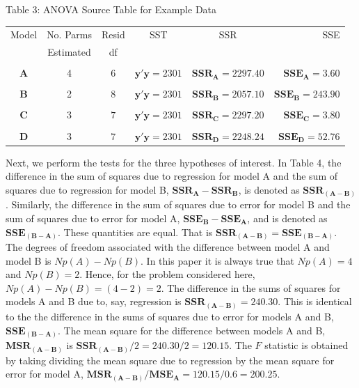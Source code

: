 \documentclass[11pt, oneside]{article}   	%
\begin{document}
\begin{table} [h]
\centerline{Table 3: ANOVA Source Table for Example Data} 
\centering
\bigskip
\begin{tabular}{cccccr}
Model & No. Parms & Resid & SST & SSR & SSE \\ 
          & Estimated &   df   &   &    & \\
\hline
    &    &     &    &    &  \\
\textbf{A}  &  4  &  $ 6 $  &  $  \mathbf{y} ' \mathbf{y} = 2301 $  & $ \mathbf{SSR_{A}} = 2297.40 $ &   $ \mathbf{SSE_{A}} =  3.60    $        \\
 &  &  &  &  &  \\
\textbf{B}  &  2  &  $ 8 $  &  $  \mathbf{y} ' \mathbf{y} = 2301 $  & $ \mathbf{SSR_{B}} = 2057.10 $ &   $  \mathbf{SSE_{B}} =  243.90   $        \\
&  &  &  &  &  \\
\textbf{C}  &  3  &  $ 7 $  &  $  \mathbf{y} ' \mathbf{y} = 2301 $  & $ \mathbf{SSR_{C}} = 2297.20 $ &   $  \mathbf{SSE_{C}} = 3.80    $        \\
&  &  &  &  &  \\
\textbf{D}  &  3  &  $ 7 $  &  $  \mathbf{y} ' \mathbf{y} = 2301 $  & $ \mathbf{SSR_{D}} = 2248.24 $ &   $  \mathbf{SSE_{D}} = 52.76    $        \\
\end{tabular} 
\end{table}

Next, we perform the tests for the three hypotheses of interest.  In Table 4, the difference in the sum of squares due to regression for model A and the sum of squares due to regression for model B, $  \mathbf{SSR_{A}} -  \mathbf{SSR_{B}} $, is denoted as $  \mathbf{SSR_{(A-B)}}  $.  Similarly, the difference in the sum of squares due to error for model B and the sum of squares due to error for model A, $  \mathbf{SSE_{B}} -  \mathbf{SSE_{A}}   $, and is denoted as $ \mathbf{ SSE_{(B-A)}}   $. These quantities are equal.  That is $   \mathbf{SSR_{(A-B)}}  =  \mathbf{ SSE_{(B-A)}}   $.  The degrees of freedom associated with the difference between model A and model B is $  Np(A) - Np(B)  $.  In this paper it is always true that $  Np(A) = 4 $ and $  Np(B) = 2  $.  Hence, for the problem considered here,  $  Np(A) - Np(B)   =  (4 - 2) =  2$.  The difference in the sums of squares for models A and B due to, say, regression is $ \mathbf{SSR_{(A-B)}}  = 240.30 $.  This is identical to the the difference in the sums of squares due to error for models A and B, $  \mathbf{SSE_{(B-A)}} $. The mean square for the difference between models A and B, $ \mathbf{MSR_{(A-B)}}  $ is $ \mathbf{SSR_{(A-B)}} / 2 = 240.30/2 = 120.15 $.  The $ F  $ statistic is obtained by taking dividing the mean square due to regression by the mean square for error for model A, $ \mathbf{MSR_{(A-B)}} / \mathbf{MSE_{A}} = 120.15/ 0.6 = 200.25 $.  
\end{document}
